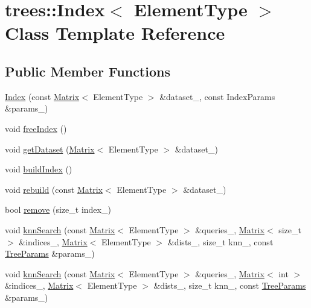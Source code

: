 \hypertarget{classtrees_1_1_index}{}\section{trees\+:\+:Index$<$ Element\+Type $>$ Class Template Reference}
\label{classtrees_1_1_index}
\subsection*{Public Member Functions}
\begin{DoxyCompactItemize}
\item 
\hyperlink{classtrees_1_1_index_a8ac9a102556cdf044f3384305b713d6d}{Index} (const \hyperlink{classtrees_1_1_matrix}{Matrix}$<$ Element\+Type $>$ \&dataset\+\_\+, const Index\+Params \&params\+\_\+)
\item 
void \hyperlink{classtrees_1_1_index_a3bbc8a66a33309b8f2f320d726ecabc9}{free\+Index} ()
\item 
void \hyperlink{classtrees_1_1_index_a56f07dc136d2fff0fc81633cd9bb78fb}{get\+Dataset} (\hyperlink{classtrees_1_1_matrix}{Matrix}$<$ Element\+Type $>$ \&dataset\+\_\+)
\item 
void \hyperlink{classtrees_1_1_index_a893641c30781d8d75b4e22135f0cbd3e}{build\+Index} ()
\item 
void \hyperlink{classtrees_1_1_index_af82fc39c391107cc9d35a3b6c14fcdc6}{rebuild} (const \hyperlink{classtrees_1_1_matrix}{Matrix}$<$ Element\+Type $>$ \&dataset\+\_\+)
\item 
bool \hyperlink{classtrees_1_1_index_ad506d4fd5a9c35a1e86d2241b7f8c370}{remove} (size\+\_\+t index\+\_\+)
\item 
void \hyperlink{classtrees_1_1_index_a716c861946ed217622a9cfc60d25196f}{knn\+Search} (const \hyperlink{classtrees_1_1_matrix}{Matrix}$<$ Element\+Type $>$ \&queries\+\_\+, \hyperlink{classtrees_1_1_matrix}{Matrix}$<$ size\+\_\+t $>$ \&indices\+\_\+, \hyperlink{classtrees_1_1_matrix}{Matrix}$<$ Element\+Type $>$ \&dists\+\_\+, size\+\_\+t knn\+\_\+, const \hyperlink{structtrees_1_1_tree_params}{Tree\+Params} \&params\+\_\+)
\item 
void \hyperlink{classtrees_1_1_index_a50aa3029ca0fc9eb3d2bb4c5d0f8e71a}{knn\+Search} (const \hyperlink{classtrees_1_1_matrix}{Matrix}$<$ Element\+Type $>$ \&queries\+\_\+, \hyperlink{classtrees_1_1_matrix}{Matrix}$<$ int $>$ \&indices\+\_\+, \hyperlink{classtrees_1_1_matrix}{Matrix}$<$ Element\+Type $>$ \&dists\+\_\+, size\+\_\+t knn\+\_\+, const \hyperlink{structtrees_1_1_tree_params}{Tree\+Params} \&params\+\_\+)

\end{DoxyCompactItemize}
